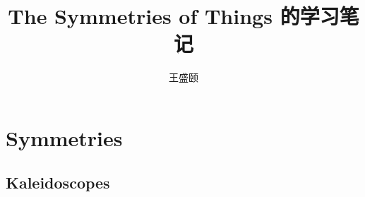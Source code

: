 \documentclass[cs4size,a4paper,adobefonts,openany]{ctexbook}
\numberwithin{equation}{section}
\begin{document}
\title{\bfseries The Symmetries of Things 的学习笔记}
\author{王盛颐}
\date{}
\maketitle
\setcounter{page}{1}
\chapter{Symmetries}
\section{Kaleidoscopes}
\end{document}
